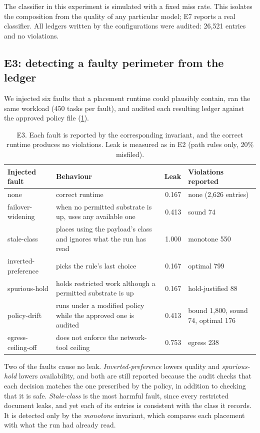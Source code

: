 The classifier in this experiment is simulated with a fixed miss rate. This isolates the
composition from the quality of any particular model; E7 reports a real classifier. All
ledgers written by the \annona{} configurations were audited: 26{,}521 entries and no
violations.

\subsection{E3: detecting a faulty perimeter from the ledger}
\label{sec:eval-compliance}

We injected six faults that a placement runtime could plausibly contain, ran the same workload
(450 tasks per fault), and audited each resulting ledger against the approved policy file
(\cref{tab:mutants}).

\begin{table}[t]
\centering\small
\begin{tabularx}{\linewidth}{@{}l X r >{\raggedright\arraybackslash}p{3.6cm}@{}}
\toprule
Injected fault & Behaviour & Leak & Violations reported \\
\midrule
none & correct runtime & 0.167 & none (2{,}626 entries) \\
failover-widening & when no permitted substrate is up, uses any available one & 0.413 & sound 74 \\
stale-class & places using the payload's class and ignores what the run has read & 1.000 & monotone 550 \\
inverted-preference & picks the rule's last choice & 0.167 & optimal 799 \\
spurious-hold & holds restricted work although a permitted substrate is up & 0.167 & hold-justified 88 \\
policy-drift & runs under a modified policy while the approved one is audited & 0.413 & bound 1{,}800, sound 74, optimal 176 \\
egress-ceiling-off & does not enforce the network-tool ceiling & 0.753 & egress 238 \\
\bottomrule
\end{tabularx}
\caption{E3. Each fault is reported by the corresponding invariant, and the correct runtime
produces no violations. Leak is measured as in E2 (path rules only, 20\% misfiled).}
\label{tab:mutants}
\end{table}

Two of the faults cause no leak. \emph{Inverted-preference} lowers quality and
\emph{spurious-hold} lowers availability, and both are still reported because the audit checks
that each decision matches the one prescribed by the policy, in addition to checking that it is
safe. \emph{Stale-class} is the most harmful fault, since every restricted document leaks, and
yet each of its entries is consistent with the class it records. It is detected only by the
\emph{monotone} invariant, which compares each placement with what the run had already read.

